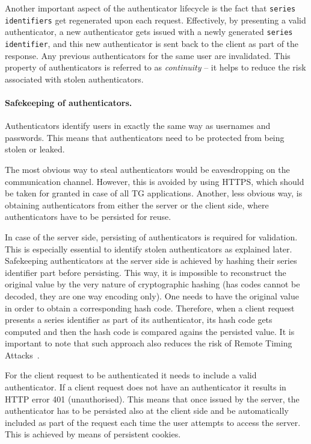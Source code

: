 \documentclass[a4paper,12pt,oneside,openright]{memoir}
\begin{document}
	Another important aspect of the authenticator lifecycle is the fact that \texttt{series identifiers} get regenerated upon each request.
	Effectively, by presenting a valid authenticator, a new authenticator gets issued with a newly generated \texttt{series identifier}, and this new authenticator is sent back to the client as part of the response.
	Any previous authenticators for the same user are invalidated.
	This property of authenticators is referred to as \emph{continuity} -- it helps to reduce the risk associated with stolen authenticators.

	\paragraph{Safekeeping of authenticators.}
	Authenticators identify users in exactly the same way as usernames and passwords.
	This means that authenticators need to be protected from being stolen or leaked.

	The most obvious way to steal authenticators would be eavesdropping on the communication channel.
	However, this is avoided by using HTTPS, which should be taken for granted in case of all TG applications.
	Another, less obvious way, is obtaining authenticators from either the server or the client side, where authenticators have to be persisted for reuse.

	In case of the server side, persisting of authenticators is required for validation.
	This is especially essential to identify stolen authenticators as explained later.
	Safekeeping authenticators at the server side is achieved by hashing their series identifier part before persisting.
	This way, it is impossible to reconstruct the original value by the very nature of cryptographic hashing (has codes cannot be decoded, they are one way encoding only).
	One needs to have the original value in order to obtain a corresponding hash code.
	Therefore, when a client request presents a series identifier as part of its authenticator, its hash code gets computed and then the hash code is compared agains the persisted value.
	It is important to note that such approach also reduces the risk of Remote Timing Attacks~\cite{RTA}.

	For the client request to be authenticated it needs to include a valid authenticator.
	If a client request does not have an authenticator it results in HTTP error 401 (unauthorised).
	This means that once issued by the server, the authenticator has to be persisted also at the client side and be automatically included as part of the request each time the user attempts to access the server.
	This is achieved by means of persistent cookies.
\end{document}
